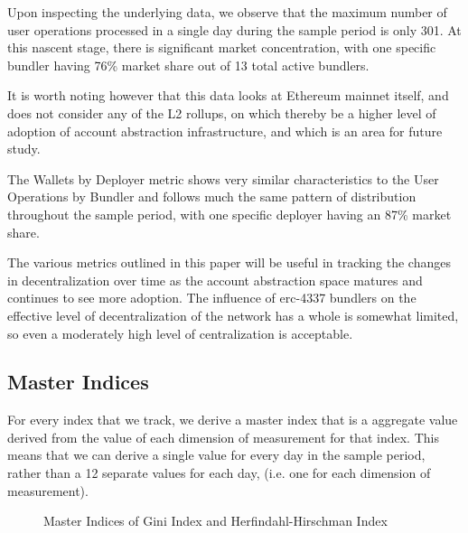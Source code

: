 \documentclass[conference]{IEEEtran}
\begin{document}
Upon inspecting the underlying data, we observe that the maximum number of user operations processed in a single day during the sample period is only 301.  At this nascent stage, there is significant market concentration, with one specific bundler having 76\% market share out of 13 total active bundlers.

It is worth noting however that this data looks at Ethereum mainnet itself, and does not consider any of the L2 rollups, on which thereby be a higher level of adoption of account abstraction infrastructure, and which is an area for future study.

The Wallets by Deployer metric shows very similar characteristics to the User Operations by Bundler and follows much the same pattern of distribution throughout the sample period, with one specific deployer having an 87\% market share.

The various metrics outlined in this paper will be useful in tracking the changes in decentralization over time as the account abstraction space matures and continues to see more adoption.  The influence of erc-4337 bundlers on the effective level of decentralization of the network has a whole is somewhat limited, so even a moderately high level of centralization is acceptable.

\subsection{Master Indices}

For every index that we track, we derive a master index that is a aggregate value derived from the value of each dimension of measurement for that index.  This means that we can derive a single value for every day in the sample period, rather than a 12 separate values for each day, (i.e. one for each dimension of measurement).

\begin{figure}[ht]
    \centering
    \datatable
    \caption{Master Indices of Gini Index and Herfindahl-Hirschman Index}
    \label{fig:masterindices}
\end{figure}
\end{document}
